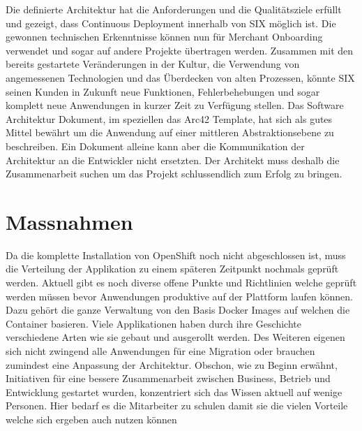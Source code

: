 Die definierte Architektur hat die Anforderungen und die Qualitätsziele erfüllt und gezeigt, dass Continuous Deployment innerhalb von SIX möglich ist. Die gewonnen technischen Erkenntnisse können nun für Merchant Onboarding verwendet und sogar auf andere Projekte übertragen werden. Zusammen mit den bereits gestartete Veränderungen in der Kultur, die Verwendung von angemessenen Technologien und das Überdecken von alten Prozessen, könnte SIX seinen Kunden in Zukunft neue Funktionen, Fehlerbehebungen und sogar komplett neue Anwendungen in kurzer Zeit zu Verfügung stellen.\newline
Das Software Architektur Dokument, im speziellen das Arc42 Template, hat sich als gutes Mittel bewährt um die Anwendung auf einer mittleren Abstraktionsebene zu beschreiben. Ein Dokument alleine kann aber die Kommunikation der Architektur an die Entwickler nicht ersetzten. Der Architekt muss deshalb die Zusammenarbeit suchen um das Projekt schlussendlich zum Erfolg zu bringen.

\chapter{Massnahmen}

Da die komplette Installation von OpenShift noch nicht abgeschlossen ist, muss die Verteilung der Applikation zu einem späteren Zeitpunkt nochmals geprüft werden. Aktuell gibt es noch diverse offene Punkte und Richtlinien welche geprüft werden müssen bevor Anwendungen produktive auf der Plattform laufen können. Dazu gehört die ganze Verwaltung von den Basis Docker Images auf welchen die Container basieren. Viele Applikationen haben durch ihre Geschichte verschiedene Arten wie sie gebaut und ausgerollt werden. Des Weiteren eigenen sich nicht zwingend alle Anwendungen für eine Migration oder brauchen zumindest eine Anpassung der Architektur. Obschon, wie zu Beginn erwähnt, Initiativen für eine bessere Zusammenarbeit zwischen Business, Betrieb und Entwicklung gestartet wurden, konzentriert sich das Wissen aktuell auf wenige Personen. Hier bedarf es die Mitarbeiter zu schulen damit sie die vielen Vorteile welche sich ergeben auch nutzen können